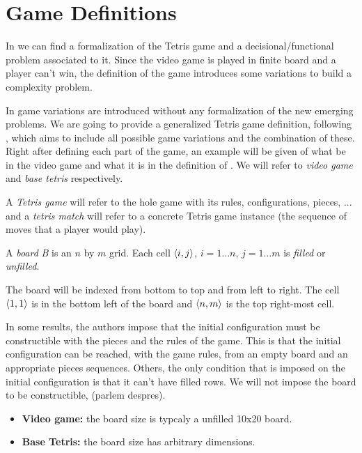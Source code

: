 \section{Game Definitions}

In \cite{TIH} we can find a formalization of the Tetris game and a decisional/functional problem associated to it. Since the video game is played in finite board and a player can't win, the definition of the game introduces some variations to build a complexity problem.

In \cite{TT,TWFP,TCB,CTV,AVG} game variations are introduced without any formalization of the new emerging problems. We are going to provide a generalized Tetris game definition, following \cite{TIH}, which aims to include all possible game variations and the combination of these. Right after defining each part of the game, an example will be given of what be in the video game and what it is in the definition of \cite{TIH}. We will refer to \emph{video game} and \emph{base tetris} respectively.

A \emph{Tetris game} will refer to the hole game with its rules, configurations, pieces, ... and a \emph{tetris match} will refer to a concrete Tetris game instance (the sequence of moves that a player would play). 

\begin{definition} 
  A \emph{board} \emph{B} is an $n$ by $m$ grid. Each cell $\cell$, $i = 1\dots n$, $j = 1\dots m$ is \emph{filled} or \emph{unfilled}.
\end{definition}

The board will be indexed from bottom to top and from left to right. The cell $\cell[1][1]$ is in the bottom left of the board and $\cell[n][m]$ is the top right-most cell.

In some results, the authors impose that the initial configuration must be constructible with the pieces and the rules of the game. This is that the initial configuration can be reached, with the game rules, from an empty board and an appropriate pieces sequences. Others, the only condition that is imposed on the initial configuration is that it can't have filled rows. We will not impose the board to be constructible, (parlem despres).

\begin{example} 
  \begin{itemize}
    \item \textbf{Video game:} the board size is typcaly a unfilled 10x20 board.
    \item \textbf{Base Tetris: } the board size has arbitrary dimensions.
  \end{itemize}
\end{example}


